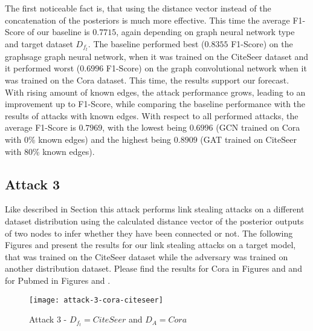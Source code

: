             The first noticeable fact is, that using the distance vector instead of the concatenation of the posteriors is much more effective.
            This time the average F1-Score of our baseline is $0.7715$, again depending on graph neural network type and target dataset $D_{f_t}$.
            The baseline performed best ($0.8355$ F1-Score) on the graphsage graph neural network, when it was trained on the  CiteSeer dataset and it performed worst ($0.6996$ F1-Score) on the graph convolutional network when it was trained on the Cora dataset.
            This time, the results support our forecast.
            With rising amount of known edges, the attack performance grows, leading to an improvement up to  F1-Score, while comparing the baseline performance with the results of attacks with known edges.
            With respect to all performed attacks, the average F1-Score is $0.7969$, with the lowest being $0.6996$ (GCN trained on Cora with 0\% known edges) and the highest being $0.8909$ (GAT trained on CiteSeer with 80\% known edges).

        \subsection*{Attack 3}
            Like described in Section  this attack performs link stealing attacks on a different dataset distribution using the calculated distance vector of the posterior outputs of two nodes to infer whether they have been connected or not. 
            The following Figures  and  present the results for our link stealing attacks on a target model, that was trained on the CiteSeer dataset while the adversary was trained on another distribution dataset.
            Please find the results for Cora in Figures  and  and for Pubmed in Figures  and .

            \begin{figure}[h]
                \begin{center}
                    \texttt{[image: attack-3-cora-citeseer]}
                    \caption{Attack 3 - $D_{f_t} = CiteSeer$ and $D_A = Cora$}
                    \label{figure:eval-att3-cora-citeseer}
                \end{center}
            \end{figure}

